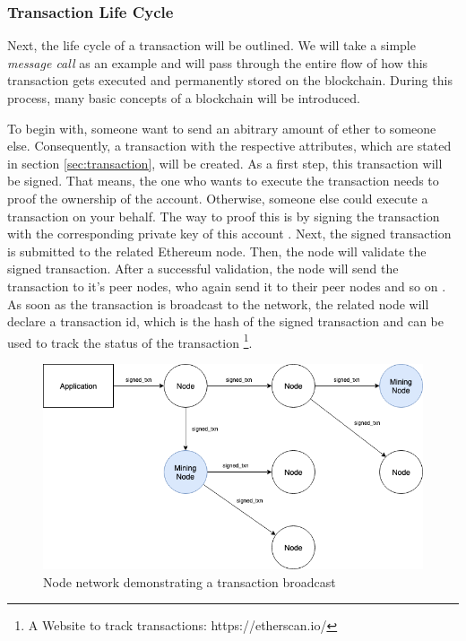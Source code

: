 \subsubsection{Transaction Life Cycle}
\label{sec:transaction_lifecycle}
Next, the life cycle of a transaction will be outlined. We will take a simple \textit{message call} as an example and will pass through the entire flow of how this transaction gets executed and permanently stored on the blockchain. During this process, many basic concepts of a blockchain will be introduced. 

To begin with, someone want to send an abitrary amount of ether to someone else. 
Consequently, a transaction with the respective attributes, which are stated 
in section \ref{sec:transaction}, will be created. As a first step, this transaction 
will be signed. That means, the one who wants to execute the transaction needs to proof the 
ownership of the account. Otherwise, someone else could execute a transaction on your behalf. 
The way to proof this is by signing the transaction with the corresponding private
key of this account . 
Next, the signed transaction is submitted to the related Ethereum node. 
Then, the node will validate the signed transaction. 
After a successful validation, the node will send the transaction to 
it's peer nodes, who again send it to their 
peer nodes and so on . 
As soon as the transaction is broadcast to the network, 
the related node will declare a transaction id, which is the hash 
of the signed transaction and can be used to track the 
status of the transaction \footnote{A Website to track transactions: https://etherscan.io/}. 

\begin{figure}[htbp]
	\centering
	\includegraphics[width=.9\linewidth]{./figures/node_network.png}
	\caption{Node network demonstrating a transaction broadcast}
	\label{figure:node_network}
\end{figure}

